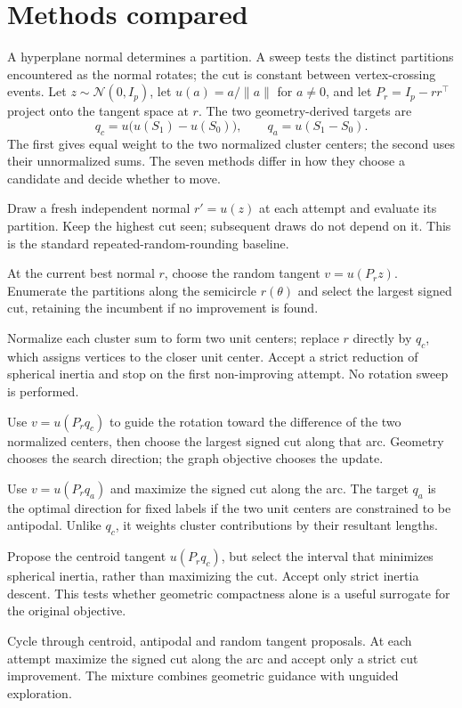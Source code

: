 \section{Methods compared}\label{sec:methods}
A hyperplane normal determines a partition. A sweep tests the distinct partitions encountered as the normal rotates; the cut is constant between vertex-crossing events. Let $z\sim\mathcal N(0,I_p)$, let $u(a)=a/\|a\|$ for $a\ne0$, and let $P_r=I_p-rr^\top$ project onto the tangent space at $r$. The two geometry-derived targets are
\[
 q_c=u\bigl(u(S_1)-u(S_0)\bigr),\qquad q_a=u(S_1-S_0).
\]
The first gives equal weight to the two normalized cluster centers; the second uses their unnormalized sums. The seven methods differ in how they choose a candidate and decide whether to move.

\begin{description}
\setlength{\itemsep}{2pt}\setlength{\parsep}{0pt}
\item[Repeated GW.] Draw a fresh independent normal $r'=u(z)$ at each attempt and evaluate its partition. Keep the highest cut seen; subsequent draws do not depend on it. This is the standard repeated-random-rounding baseline.
\item[Random sweep.] At the current best normal $r$, choose the random tangent $v=u(P_r z)$. Enumerate the partitions along the semicircle $r(\theta)$ and select the largest signed cut, retaining the incumbent if no improvement is found.
\item[Spherical two-means.] Normalize each cluster sum to form two unit centers; replace $r$ directly by $q_c$, which assigns vertices to the closer unit center. Accept a strict reduction of spherical inertia and stop on the first non-improving attempt. No rotation sweep is performed.
\item[Centroid sweep.] Use $v=u(P_r q_c)$ to guide the rotation toward the difference of the two normalized centers, then choose the largest signed cut along that arc. Geometry chooses the search direction; the graph objective chooses the update.
\item[Antipodal sweep.] Use $v=u(P_r q_a)$ and maximize the signed cut along the arc. The target $q_a$ is the optimal direction for fixed labels if the two unit centers are constrained to be antipodal. Unlike $q_c$, it weights cluster contributions by their resultant lengths.
\item[Inertia sweep.] Propose the centroid tangent $u(P_r q_c)$, but select the interval that minimizes spherical inertia, rather than maximizing the cut. Accept only strict inertia descent. This tests whether geometric compactness alone is a useful surrogate for the original objective.
\item[Hybrid sweep.] Cycle through centroid, antipodal and random tangent proposals. At each attempt maximize the signed cut along the arc and accept only a strict cut improvement. The mixture combines geometric guidance with unguided exploration.
\end{description}

